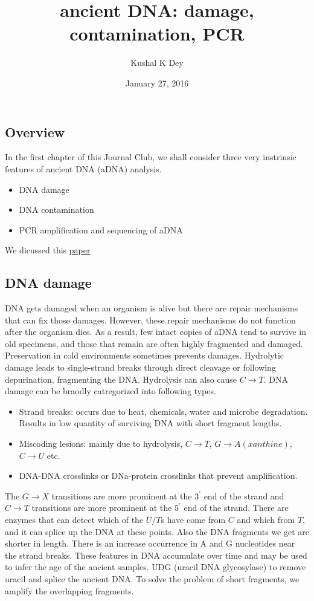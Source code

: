 \documentclass[]{article}
\title{ancient DNA: damage, contamination, PCR}
\author{Kushal K Dey}
\date{January 27, 2016}
\begin{document}
\maketitle


\subsection{Overview}\label{overview}

In the first chapter of this Journal Club, we shall consider three very
instrinsic features of ancient DNA (aDNA) analysis.

\begin{itemize}
\item DNA damage
\item DNA contamination 
\item PCR amplification and sequencing of aDNA 
\end{itemize}

We dicussed this \href{../paper/Paabo_Wk1.pdf}{paper}

\subsection{DNA damage}\label{dna-damage}

DNA gets damaged when an organism is alive but there are repair
mechanisms that can fix those damages. However, these repair mechanisms
do not function after the organism dies. As a result, few intact copies
of aDNA tend to survive in old specimens, and those that remain are
often highly fragmented and damaged. Preservation in cold environments
sometimes prevents damages. Hydrolytic damage leads to single-strand
breaks through direct cleavage or following depurination, fragmenting
the DNA. Hydrolysis can also cause \(C \rightarrow T\). DNA damage can
be braodly catregorized into following types.

\begin{itemize}
\item Strand breaks: occurs due to heat, chemicals, water and microbe degradation. Results in low quantity of surviving DNA with short fragment lengths. 
\item Miscoding lesions: mainly due to hydrolysis, $C \rightarrow T$, $G \rightarrow A (xanthine)$, $C \rightarrow U$ etc. 
\item DNA-DNA crosslinks or DNa-protein crosslinks that prevent amplification.
\end{itemize}

The \(G \rightarrow X\) transitions are more prominent at the \(3^{'}\)
end of the strand and \(C \rightarrow T\) transitions are more prominent
at the \(5^{'}\) end of the strand. There are enzymes that can detect
which of the \(U/T\)s have come from \(C\) and which from \(T\), and it
can splice up the DNA at these points. Also the DNA fragments we get are
shorter in length. There is an increase occurrence in A and G
nucleotides near the strand breaks. These features in DNA accumulate
over time and may be used to infer the age of the ancient samples. UDG
(uracil DNA glycosylase) to remove uracil and splice the ancient DNA. To
solve the problem of short fragments, we amplify the overlapping
fragments.
\end{document}
